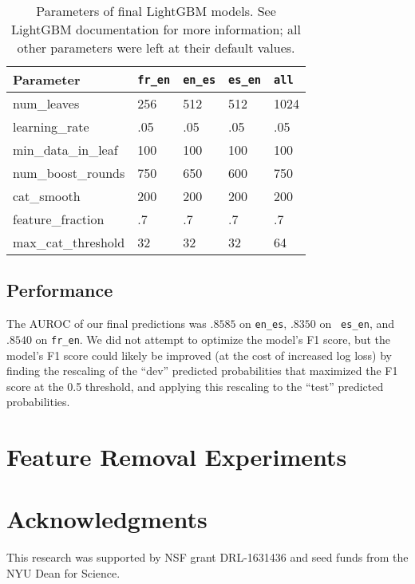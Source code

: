 \documentclass[11pt,a4paper]{article}
\begin{document}
\begin{table}[t!]
\small
\begin{center}
\begin{tabular}{|l|llll|}
  \hline \bf Parameter & {\tt fr\_en} & {\tt en\_es} & {\tt es\_en} & {\tt all} \\ \hline
  num\_leaves & 256 & 512 & 512 & 1024 \\
  learning\_rate & .05 & .05 & .05 & .05 \\
  min\_data\_in\_leaf & 100 & 100 & 100 & 100 \\
  num\_boost\_rounds & 750 & 650 & 600 & 750 \\
  cat\_smooth & 200 & 200 & 200& 200 \\
  feature\_fraction & .7 & .7 & .7 & .7 \\
  max\_cat\_threshold & 32 & 32 & 32& 64 \\

\hline
\end{tabular}
\end{center}
\caption{\label{lightgbm-params} Parameters of final LightGBM models. See
  LightGBM documentation for more information; all other parameters were left at
their default values.}
\end{table}

\subsection{Performance}

The AUROC of our final predictions was $.8585$ on {\tt en\_es}, $.8350$ on {\tt
  es\_en}, and $.8540$ on {\tt fr\_en}. We did not attempt to optimize the model's
F1 score, but the model's F1 score could likely be improved (at the cost of
increased log loss) by finding the
rescaling of the ``dev'' predicted probabilities that maximized the F1 score at
the 0.5 threshold, and applying this rescaling to the ``test'' predicted probabilities.

\section{Feature Removal Experiments}

\section{Acknowledgments}
This research was supported by NSF grant DRL-1631436 and
seed funds from the NYU Dean for Science.



\end{document}
